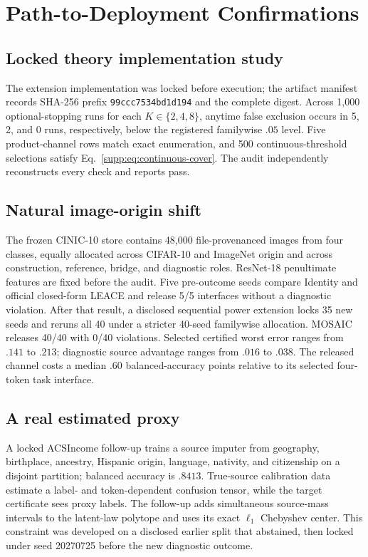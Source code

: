 \section{Path-to-Deployment Confirmations}

\subsection{Locked theory implementation study}

The extension implementation was locked before execution; the artifact
manifest records SHA-256 prefix \texttt{99ccc7534bd1d194} and the complete
digest.
Across 1,000 optional-stopping runs for each $K\in\{2,4,8\}$, anytime false
exclusion occurs in 5, 2, and 0 runs, respectively, below the registered
familywise $.05$ level. Five product-channel rows match exact enumeration, and
500 continuous-threshold selections satisfy Eq.~\eqref{supp:eq:continuous-cover}.
The audit independently reconstructs every check and reports pass.

\subsection{Natural image-origin shift}

The frozen CINIC-10 store contains 48,000 file-provenanced images from four
classes, equally allocated across CIFAR-10 and ImageNet origin and across
construction, reference, bridge, and diagnostic roles. ResNet-18 penultimate
features are fixed before the audit. Five pre-outcome seeds compare Identity
and official closed-form LEACE and release 5/5 interfaces without a diagnostic
violation. After that result, a disclosed sequential power extension locks 35
new seeds and reruns all 40 under a stricter 40-seed familywise allocation.
MOSAIC releases 40/40 with 0/40 violations. Selected certified worst error
ranges from $.141$ to $.213$; diagnostic source advantage ranges from $.016$
to $.038$. The released channel costs a median $.60$ balanced-accuracy points
relative to its selected four-token task interface.

\subsection{A real estimated proxy}

A locked ACSIncome follow-up trains a source imputer from geography,
birthplace, ancestry, Hispanic origin, language, nativity, and citizenship on
a disjoint partition; balanced accuracy is $.8413$. True-source calibration
data estimate a label- and token-dependent confusion tensor, while the target
certificate sees proxy labels. The follow-up adds simultaneous source-mass
intervals to the latent-law polytope and uses its exact $\ell_1$ Chebyshev
center. This constraint was developed on a disclosed earlier split that
abstained, then locked under seed 20270725 before the new diagnostic outcome.

